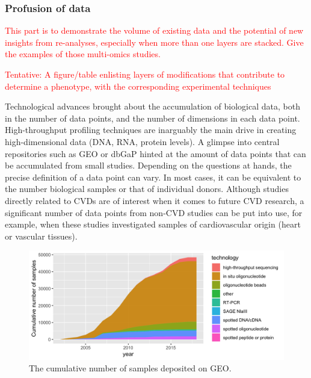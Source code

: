 \documentclass[letter]{bioinfo}
\newcommand{\comment}[1]{\textcolor{red}{#1}}
\begin{document}
\subsubsection{Profusion of data}


\comment{This part is to demonstrate the volume of existing data and the potential of new insights from re-analyses, especially when more than one layers are stacked. Give the examples of those multi-omics studies.}


\comment{Tentative: A figure/table enlisting layers of modifications that contribute to determine a phenotype, with the corresponding experimental techniques}

\cite{Santolini:2018:personalized} 

\cite{Klarin:2017:Genetic}

Technological advances brought about the accumulation of biological data, both in the number of data points, and the number of dimensions in each data point.
High-throughput profiling techniques are inarguably the main drive in creating high-dimensional data (DNA, RNA, protein levels).
A glimpse into central repositories such as GEO or dbGaP hinted at the amount of data points that can be accumulated from small  studies. Depending on the questions at hands, the precise definition of a data point can vary. In most cases, it can be equivalent to the number biological samples or that of individual donors. Although studies directly related to CVDs are of interest when it comes to future CVD research, a significant number of data points from non-CVD studies can be put into use, for example, when these studies investigated samples of cardiovascular origin (heart or vascular tissues).

\begin{figure}[!tpb]%
	\includegraphics[width=1\linewidth]{gsm_count_by_tech.png}
	\caption{The cumulative number of samples deposited on GEO.}
	\label{fig:01}
\end{figure}
\end{document}
